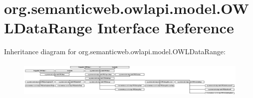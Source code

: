 \hypertarget{interfaceorg_1_1semanticweb_1_1owlapi_1_1model_1_1_o_w_l_data_range}{\section{org.\-semanticweb.\-owlapi.\-model.\-O\-W\-L\-Data\-Range Interface Reference}
\label{interfaceorg_1_1semanticweb_1_1owlapi_1_1model_1_1_o_w_l_data_range}
}
Inheritance diagram for org.\-semanticweb.\-owlapi.\-model.\-O\-W\-L\-Data\-Range\-:\begin{figure}[H]
\begin{center}
\leavevmode
\includegraphics[height=1.763085cm]{interfaceorg_1_1semanticweb_1_1owlapi_1_1model_1_1_o_w_l_data_range}
\end{center}
\end{figure}
